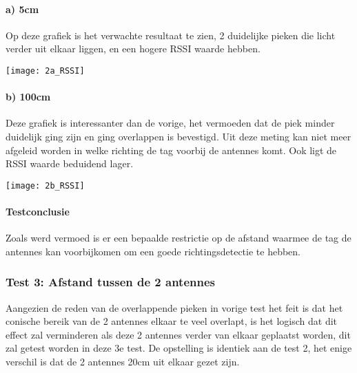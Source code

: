 \paragraph{a) 5cm}
\begin{minipage}{0.55\textwidth}
Op deze grafiek is het verwachte resultaat te zien, 2 duidelijke pieken die licht verder uit elkaar liggen, en een hogere RSSI waarde hebben.
\end{minipage}
\hfill
\begin{minipage}{0.42\textwidth}
	\texttt{[image: 2a\_RSSI]}
	\label{fig:ond-rfid-static-2a-res}
\end{minipage}

\paragraph{b) 100cm}
\begin{minipage}{0.55\textwidth}
Deze grafiek is interessanter dan de vorige, het vermoeden dat de piek minder duidelijk ging zijn en ging overlappen is bevestigd. Uit deze meting kan niet meer afgeleid worden in welke richting de tag voorbij de antennes komt. Ook ligt de RSSI waarde beduidend lager.
\end{minipage}
\hfill
\begin{minipage}{0.42\textwidth}
	\texttt{[image: 2b\_RSSI]}
	\label{fig:ond-rfid-static-2b-res}
\end{minipage}

\paragraph{Testconclusie}
Zoals werd vermoed is er een bepaalde restrictie op de afstand waarmee de tag de antennes kan voorbijkomen om een goede richtingsdetectie te hebben. 

\subsubsection{Test 3: Afstand tussen de 2 antennes}
Aangezien de reden van de overlappende pieken in vorige test het feit is dat het conische bereik van de 2 antennes elkaar te veel overlapt, is het logisch dat dit effect zal verminderen als deze 2 antennes verder van elkaar geplaatst worden, dit zal getest worden in deze 3e test. De opstelling is identiek aan de test 2, het enige verschil is dat de 2 antennes 20cm uit elkaar gezet zijn.

